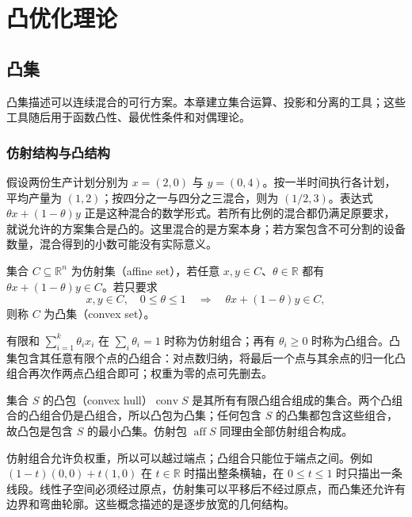 \documentclass[UTF8,12pt,a4paper,fontset=fandol]{ctexbook}
\begin{document}
\part{凸优化理论}

\chapter{凸集}
\label{ch:co-sets}

凸集描述可以连续混合的可行方案。本章建立集合运算、投影和分离的工具；这些工具随后用于函数凸性、最优性条件和对偶理论。

\section{仿射结构与凸结构}

假设两份生产计划分别为 $x=(2,0)$ 与 $y=(0,4)$。按一半时间执行各计划，平均产量为 $(1,2)$；按四分之一与四分之三混合，则为 $(1/2,3)$。表达式 $\theta x+(1-\theta)y$ 正是这种混合的数学形式。若所有比例的混合都仍满足原要求，就说允许的方案集合是凸的。这里混合的是方案本身；若方案包含不可分割的设备数量，混合得到的小数可能没有实际意义。

\begin{definition}
集合 $C\subseteq\mathbb R^n$ 为仿射集（affine set），若任意 $x,y\in C$、$\theta\in\mathbb R$ 都有 $\theta x+(1-\theta)y\in C$。若只要求
\begin{equation}
 x,y\in C,\quad0\leq\theta\leq1
 \quad\Longrightarrow\quad\theta x+(1-\theta)y\in C,
 \label{eq:co-convex-set}
\end{equation}
则称 $C$ 为凸集（convex set）。
\end{definition}

有限和 $\sum_{i=1}^k\theta_i x_i$ 在 $\sum_i\theta_i=1$ 时称为仿射组合；再有 $\theta_i\geq0$ 时称为凸组合。凸集包含其任意有限个点的凸组合：对点数归纳，将最后一个点与其余点的归一化凸组合再次作两点凸组合即可；权重为零的点可先删去。

集合 $S$ 的凸包（convex hull）$\operatorname{conv}S$ 是其所有有限凸组合组成的集合。两个凸组合的凸组合仍是凸组合，所以凸包为凸集；任何包含 $S$ 的凸集都包含这些组合，故凸包是包含 $S$ 的最小凸集。仿射包 $\operatorname{aff}S$ 同理由全部仿射组合构成。

仿射组合允许负权重，所以可以越过端点；凸组合只能位于端点之间。例如 $(1-t)(0,0)+t(1,0)$ 在 $t\in\mathbb R$ 时描出整条横轴，在 $0\leq t\leq1$ 时只描出一条线段。线性子空间必须经过原点，仿射集可以平移后不经过原点，而凸集还允许有边界和弯曲轮廓。这些概念描述的是逐步放宽的几何结构。
\end{document}
